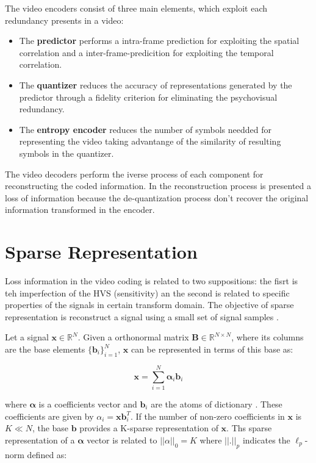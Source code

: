 The video encoders consist of three main elements, which exploit each 
redundancy presents in  a video:

\begin{itemize}
	\item The \textbf{predictor} performs a intra-frame prediction for
	exploiting the spatial correlation and  a inter-frame-predicition for
	exploiting the temporal correlation.
	\item The \textbf{quantizer} reduces the accuracy of representations generated
	by the predictor through a fidelity criterion for eliminating the psychovisual
	redundancy.
	\item The \textbf{entropy encoder} reduces the number of symbols needded for
	representing the video taking advantange of the similarity of resulting symbols
	in the quantizer.
\end{itemize}

The video decoders perform the iverse process of each component for
reconstructing the coded information. In the reconstruction process is presented
a loss of information because the de-quantization process don't recover the
original information transformed in the encoder.

\section{Sparse Representation}

Loss information in the video coding is related to two suppositions: the fisrt
is teh imperfection of the HVS (sensitivity) an the second is related to
specific properties of the signals in certain transform domain. The objective of
sparse representation is reconstruct a signal using a small set of signal
samples \cite{compressive}. 

Let a signal $\boldsymbol{x} \in \mathbb{R}^N$. Given a orthonormal matrix
$\boldsymbol{B} \in \mathbb{R}^{N \times N}$, where its columns are the base
elements $ \{\boldsymbol{b}_i\}_{i=1}^N$, $\boldsymbol{x}$ can be represented
in terms of this base as:

\begin{center}
\begin{equation}
\boldsymbol{x}=\sum \limits_{i=1}^{N} \boldsymbol{\alpha}_i \boldsymbol{b}_i
\end{equation}
\end{center}

where $\boldsymbol{\alpha}$ is a coefficients vector and $\boldsymbol{b}_i$ are
the atoms of dictionary \cite{sparsity}. These coefficients are given by
$\alpha_i = \boldsymbol{x} \boldsymbol{b}_i^T$. If the number of non-zero
coefficients in $\boldsymbol{x}$ is $K\ll N$, the base $\boldsymbol{b}$
provides a K-sparse representation of $\boldsymbol{x}$. Ths sparse
representation of a $\boldsymbol{\alpha}$ vector  is related to $||\alpha||_0 =
K$ where $||.||_p$ indicates the  $\ell_p$-norm defined as:

